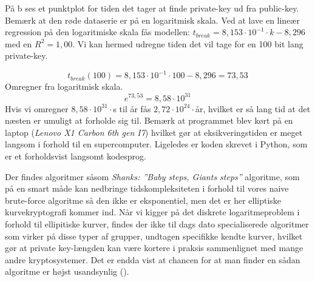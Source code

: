 På b ses et punktplot for tiden det tager at finde private-key ud fra public-key. Bemærk at den røde dataserie er på en logaritmisk skala. Ved at lave en lineær regression på den logaritmiske skala fås modellen: $t_{break}=8,153 \cdot 10^{-1} \cdot k-8,296$ med en $R^2=1,00$. Vi kan hermed udregne tiden det vil tage for en 100 bit lang private-key.

$$t_{break}(100)=8,153 \cdot 10^{-1} \cdot 100 - 8,296 = 73,53$$
Omregner fra logaritmisk skala.
$$e^{73,53}=8,58\cdot 10^{31}$$
Hvis vi omregner $8,58\cdot 10^{31}\cdot$s til år fås $2,72 \cdot 10^{24}\cdot$år, hvilket er så lang tid at det næsten er umuligt at forholde sig til. Bemærk at programmet blev kørt på en laptop (\textit{Lenovo X1 Carbon 6th gen I7}) hvilket gør at eksikveringstiden er meget langsom i forhold til en supercomputer. Ligeledes er koden skrevet i Python, som er et forholdsvist langsomt kodesprog.  

Der findes algoritmer såsom \textit{Shanks: ”Baby steps, Giants steps”} algoritme, som på en smart måde kan nedbringe tidskompleksiteten i forhold til vores naive brute-force algoritme så den ikke er eksponentiel, men det er her elliptiske kurvekryptografi kommer ind. Når vi kigger på det diskrete logaritmeproblem i forhold til ellipitiske kurver, findes der ikke til dags dato specialiserede algoritmer som virker på disse typer af grupper, undtagen specifikke kendte kurver, hvilket gør at private key-længden kan være kortere i praksis sammenlignet med mange andre kryptosystemer. Det er endda vist at chancen for at man finder en sådan algoritme er højst usandsynlig (\cite{Ramachandran}).